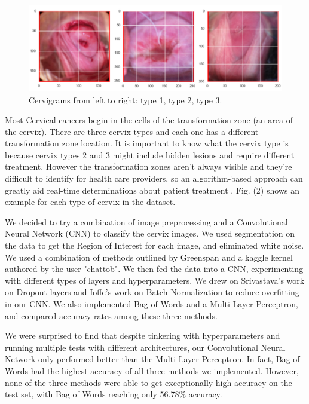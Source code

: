 \documentclass{article}
\begin{document}
\begin{figure}[ht]
  \vskip 0.2in
  \begin{center}
  \centerline{\includegraphics[width=\columnwidth]{types123}}
  \caption {Cervigrams from left to right: type 1, type 2, type 3.}
  \label{cervigram}
  \end{center}
  \vskip -0.2in
\end{figure}

Most Cervical cancers begin in the cells of the transformation zone
(an area of the cervix). There are three cervix types and each one has
a different transformation zone location. It is important to know what
the cervix type is because cervix types 2 and 3 might include hidden
lesions and require different treatment. However the transformation
zones aren't always visible and they're difficult to identify for
health care providers, so an algorithm-based approach can greatly aid
real-time determinations about patient treatment
\cite{kaggle}. Fig. (2) shows an example for each type of cervix in
the dataset. 

We decided to try a combination of image preprocessing and a Convolutional Neural Network (CNN) to classify the cervix images. We used segmentation on the data to get the Region of Interest for each image, and eliminated white noise. We used a combination of methods outlined by Greenspan and a kaggle kernel authored by the user "chattob". We then fed the data into a CNN, experimenting with different types of layers and hyperparameters. We drew on Srivastava's work on Dropout layers and Ioffe's work on Batch Normalization to reduce overfitting in our CNN. We also implemented Bag of Words and a Multi-Layer Perceptron, and compared accuracy rates among these three methods.

We were surprised to find that despite tinkering with hyperparameters and running multiple tests with different architectures, our Convolutional Neural Network only performed better than the Multi-Layer Perceptron. In fact, Bag of Words had the highest accuracy of all three methods we implemented. However, none of the three methods were able to get exceptionally high accuracy on the test set, with Bag of Words reaching only 56.78\% accuracy.
\end{document}
